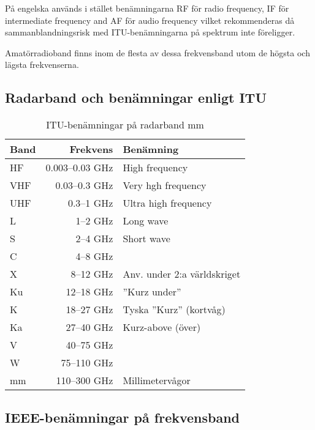 På engelska används i stället be\-nämn\-ing\-ar\-na RF för radio frequency, IF
för intermediate frequency and AF för audio frequency vilket rekommenderas då
sammanblandningsrisk med ITU-be\-nämn\-ing\-ar\-na på spektrum inte
föreligger.

Amatörradioband finns inom de flesta av dessa frekvensband utom de högsta och
lägsta frekvenserna.

\subsection{Radarband och benämningar enligt ITU}

\begin{table}[H]
\centering

\begin{tabular}{lrl}
	\textbf{Band} & \textbf{Frekvens} & \textbf{Benämning}          \\ \hline
	HF            &   0.003--0.03 GHz & High frequency              \\
	VHF           &     0.03--0.3 GHz & Very hgh frequency          \\
	UHF           &        0.3--1 GHz & Ultra high frequency        \\
	L             &          1--2 GHz & Long wave                   \\
	S             &          2--4 GHz & Short wave                  \\
	C             &          4--8 GHz &  \\
	X             &         8--12 GHz & Anv. under 2:a världskriget \\
	Ku            &        12--18 GHz & ''Kurz under''              \\
	K             &        18--27 GHz & Tyska ''Kurz'' (kortvåg)    \\
	Ka            &        27--40 GHz & Kurz-above (över)           \\
	V             &        40--75 GHz &  \\
	W             &       75--110 GHz &  \\
	mm            &      110--300 GHz & Millimetervågor
\end{tabular}
\caption{ITU-benämningar på radarband mm}
\end{table}

\subsection{IEEE-benämningar på frekvensband}
\label{sec:IEEE-benamningar}

